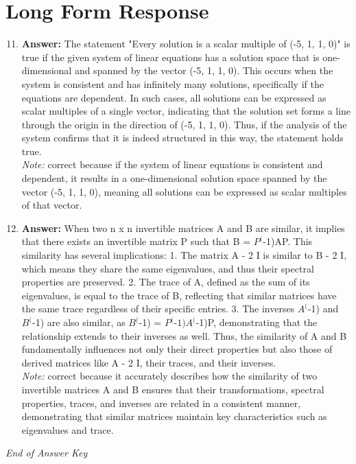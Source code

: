 \documentclass[12pt]{article}
\begin{document}
\section*{Long Form Response}
\begin{enumerate}[label=\arabic*.]
\setcounter{enumi}{10}
\item \textbf{Answer:} The statement "Every solution is a scalar multiple of (-5, 1, 1, 0)" is true if the given system of linear equations has a solution space that is one-dimensional and spanned by the vector (-5, 1, 1, 0). This occurs when the system is consistent and has infinitely many solutions, specifically if the equations are dependent. In such cases, all solutions can be expressed as scalar multiples of a single vector, indicating that the solution set forms a line through the origin in the direction of (-5, 1, 1, 0). Thus, if the analysis of the system confirms that it is indeed structured in this way, the statement holds true.
\\ \textit{Note:} correct because if the system of linear equations is consistent and dependent, it results in a one-dimensional solution space spanned by the vector (-5, 1, 1, 0), meaning all solutions can be expressed as scalar multiples of that vector.
\item \textbf{Answer:} When two n x n invertible matrices A and B are similar, it implies that there exists an invertible matrix P such that B = $P^($-1)AP. This similarity has several implications: 1. The matrix A - 2 I is similar to B - 2 I, which means they share the same eigenvalues, and thus their spectral properties are preserved. 2. The trace of A, defined as the sum of its eigenvalues, is equal to the trace of B, reflecting that similar matrices have the same trace regardless of their specific entries. 3. The inverses $A^($-1) and $B^($-1) are also similar, as $B^($-1) = $P^($-$1)A^($-1)P, demonstrating that the relationship extends to their inverses as well. Thus, the similarity of A and B fundamentally influences not only their direct properties but also those of derived matrices like A - 2 I, their traces, and their inverses.
\\ \textit{Note:} correct because it accurately describes how the similarity of two invertible matrices A and B ensures that their transformations, spectral properties, traces, and inverses are related in a consistent manner, demonstrating that similar matrices maintain key characteristics such as eigenvalues and trace.
\end{enumerate}

\vfill
\noindent\textit{End of Answer Key}
\end{document}
